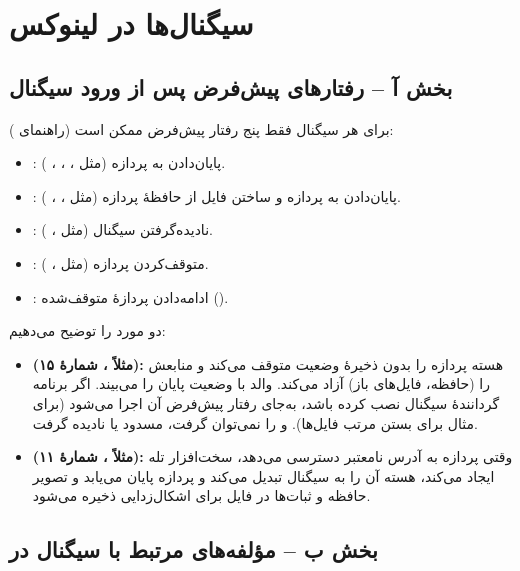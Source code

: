\section{سیگنال‌ها در لینوکس}

\subsection*{بخش آ – رفتارهای پیش‌فرض پس از ورود سیگنال}

برای هر سیگنال فقط پنج رفتار پیش‌فرض ممکن است (راهنمای ):
\begin{itemize}
  \item {}: پایان‌دادن به پردازه (مثل ، ، ، ).
  \item {}: پایان‌دادن به پردازه و ساختن فایل  از حافظهٔ پردازه (مثل ، ، ).
  \item {}: نادیده‌گرفتن سیگنال (مثل ، ).
  \item {}: متوقف‌کردن پردازه (مثل ، ).
  \item {}: ادامه‌دادن پردازهٔ متوقف‌شده ().
\end{itemize}

دو مورد را توضیح می‌دهیم:
\begin{itemize}
  \item \textbf{ (مثلاً ، شمارهٔ ۱۵):} هسته پردازه را بدون ذخیرهٔ وضعیت متوقف می‌کند و منابعش را (حافظه، فایل‌های باز) آزاد می‌کند. والد با  وضعیت پایان را می‌بیند. اگر برنامه گردانندهٔ سیگنال نصب کرده باشد، به‌جای رفتار پیش‌فرض آن اجرا می‌شود (برای مثال برای بستن مرتب فایل‌ها).  و  را نمی‌توان گرفت، مسدود یا نادیده گرفت.
  \item \textbf{ (مثلاً ، شمارهٔ ۱۱):} وقتی پردازه به آدرس نامعتبر دسترسی می‌دهد، سخت‌افزار تله ایجاد می‌کند، هسته آن را به سیگنال تبدیل می‌کند و پردازه پایان می‌یابد و تصویر حافظه و ثبات‌ها در فایل  برای اشکال‌زدایی ذخیره می‌شود.
\end{itemize}

\subsection*{بخش ب – مؤلفه‌های مرتبط با سیگنال در }

